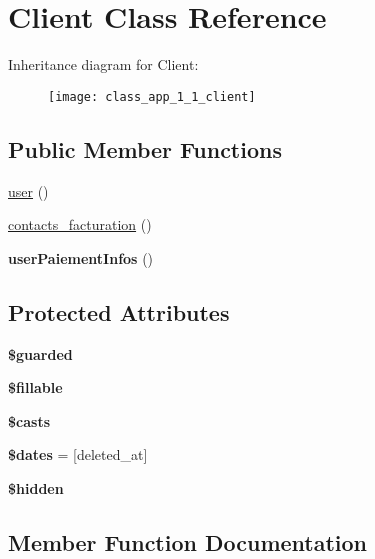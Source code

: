 \hypertarget{class_app_1_1_client}{}\section{Client Class Reference}
\label{class_app_1_1_client}
Inheritance diagram for Client\+:\begin{figure}[H]
\begin{center}
\leavevmode
\texttt{[image: class\_app\_1\_1\_client]}
\end{center}
\end{figure}
\subsection*{Public Member Functions}
\begin{DoxyCompactItemize}
\item 
\mbox{\hyperlink{class_app_1_1_client_ae8a275690ff1b618e1947378b0ed73ae}{user}} ()
\item 
\mbox{\hyperlink{class_app_1_1_client_aa5634dbe5b14ca46958036934ea1a92c}{contacts\+\_\+facturation}} ()
\item 
\mbox{\label{class_app_1_1_client_a8d1910bf741f9d4ad263ea3748bb7bfb}} 
{\bfseries user\+Paiement\+Infos} ()
\end{DoxyCompactItemize}
\subsection*{Protected Attributes}
\begin{DoxyCompactItemize}
\item 
{\bfseries \$guarded}
\item 
{\bfseries \$fillable}
\item 
{\bfseries \$casts}
\item 
\mbox{\label{class_app_1_1_client_aab581066837d6296ba35c72937b6fc1c}} 
{\bfseries \$dates} = \mbox{[}\textquotesingle{}deleted\+\_\+at\textquotesingle{}\mbox{]}
\item 
{\bfseries \$hidden}
\end{DoxyCompactItemize}


\subsection{Member Function Documentation}
\mbox{\label{class_app_1_1_client_aa5634dbe5b14ca46958036934ea1a92c}} 
